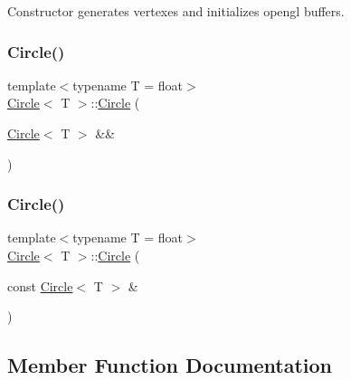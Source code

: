 Constructor generates vertexes and initializes opengl buffers. \mbox{\label{classCircle_ad4ee8eadfd4201a937af204ac4e6ec37}} 
\subsubsection{\texorpdfstring{Circle()}{Circle()}\hspace{0.1cm}{\footnotesize\ttfamily [2/3]}}
{\footnotesize\ttfamily template$<$typename T  = float$>$ \\
\mbox{\hyperlink{classCircle}{Circle}}$<$ T $>$\+::\mbox{\hyperlink{classCircle}{Circle}} (\begin{DoxyParamCaption}\item[{\mbox{\hyperlink{classCircle}{Circle}}$<$ T $>$ \&\&}]{ }\end{DoxyParamCaption})\hspace{0.3cm}{\ttfamily [default]}}

\mbox{\label{classCircle_a163162aa8beaceb25ebd9a17966f4bd5}} 
\subsubsection{\texorpdfstring{Circle()}{Circle()}\hspace{0.1cm}{\footnotesize\ttfamily [3/3]}}
{\footnotesize\ttfamily template$<$typename T  = float$>$ \\
\mbox{\hyperlink{classCircle}{Circle}}$<$ T $>$\+::\mbox{\hyperlink{classCircle}{Circle}} (\begin{DoxyParamCaption}\item[{const \mbox{\hyperlink{classCircle}{Circle}}$<$ T $>$ \&}]{ }\end{DoxyParamCaption})\hspace{0.3cm}{\ttfamily [default]}}



\subsection{Member Function Documentation}
\mbox{\label{classCircle_a07ce44d6b3a70ee7cbcf19e02e50c361}} 
